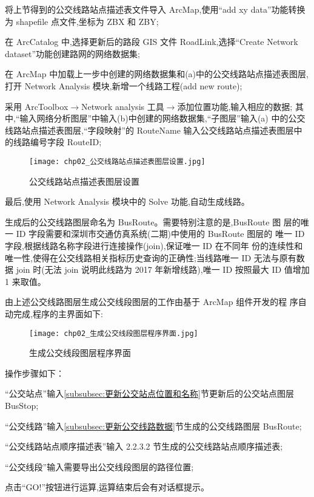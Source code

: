 \begin{nbeae}
\item 将上节得到的公交线路站点描述表文件导入 ArcMap,使用“add
xy data”功能转换为 shapefile 点文件,坐标为 ZBX 和 ZBY;
\item 在 ArcCatalog 中,选择更新后的路段 GIS 文件 RoadLink,选择“Create Network
dataset”功能创建路网的网络数据集;
\item 在 ArcMap 中加载上一步中创建的网络数据集和(a)中的公交线路站点描述表图层,
打开 Network Analysis 模块,新增一个线路工程(add new route);
\item 采用 ArcToolbox$\rightarrow$Network analysis 工具$\rightarrow$添加位置功能,输入相应的数据;
其中,“输入网络分析图层”中输入(b)中创建的网络数据集,“子图层”输入(a)
中的公交线路站点描述表图层,“字段映射”的 RouteName 输入公交线路站点描述表图层中的线路编号字段 RouteID;
\begin{figure}[!htbp]
  \centering
  \texttt{[image: chp02\_公交线路站点描述表图层设置.jpg]}
  \caption{公交线路站点描述表图层设置\label{fig:公交线路站点描述表图层设置} }
\end{figure}
\item 最后,使用 Network Analysis 模块中的 Solve 功能,自动生成线路。
\end{nbeae}

生成后的公交线路图层命名为 BusRoute。需要特别注意的是,BusRoute 图
层的唯一 ID 字段需要和深圳市交通仿真系统(二期)中使用的 BusRoute 图层的
唯一 ID 字段,根据线路名称字段进行连接操作(join),保证唯一 ID 在不同年
份的连续性和唯一性,使得在公交线路相关指标历史查询的正确性;当线路唯一
ID 无法与原有数据 join 时(无法 join 说明此线路为 2017 年新增线路),唯一 ID
按照最大 ID 值增加 1 来取值。

由上述公交线路图层生成公交线段图层的工作由基于 ArcMap 组件开发的程
序自动完成,程序的主界面如下:
\begin{figure}[!htbp]
  \centering
  \texttt{[image: chp02\_生成公交线段图层程序界面.jpg]}
  \caption{生成公交线段图层程序界面\label{fig:生成公交线段图层程序界面} }
\end{figure}

操作步骤如下：
\begin{nbeae}
\item “公交站点”输入\ref{subsubsec:更新公交站点位置和名称}节更新后的公交站点图层 BusStop;
\item “公交线路”输入\ref{subsubsec:更新公交线路数据}节生成的公交线路图层 BusRoute;
\item “公交线路站点顺序描述表”输入 2.2.3.2 节生成的公交线路站点顺序描述表;
\item “公交线段”输入需要导出公交线段图层的路径位置;
\item 点击“GO!”按钮进行运算,运算结束后会有对话框提示。
\end{nbeae}

